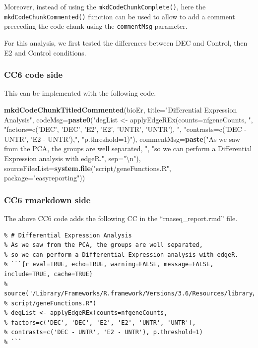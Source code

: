 \documentclass[]{article}
\newenvironment{Shaded}{\begin{snugshade}}{\end{snugshade}}
\newcommand{\CharTok}[1]{\textcolor[rgb]{0.31,0.60,0.02}{#1}}
\newcommand{\DataTypeTok}[1]{\textcolor[rgb]{0.13,0.29,0.53}{#1}}
\newcommand{\KeywordTok}[1]{\textcolor[rgb]{0.13,0.29,0.53}{\textbf{#1}}}
\newcommand{\NormalTok}[1]{#1}
\newcommand{\StringTok}[1]{\textcolor[rgb]{0.31,0.60,0.02}{#1}}
\begin{document}
Moreover, instead of using the \texttt{mkdCodeChunkComplete()}, here the
\texttt{mkdCodeChunkCommented()} function can be used to allow to add a
comment preceeding the code chunk using the \texttt{commentMsg}
parameter.

For this analysis, we first tested the differences between DEC and
Control, then E2 and Control conditions.

\hypertarget{cc6-code-side}{%
\subsubsection{CC6 code side}\label{cc6-code-side}}

This can be implemented with the following code.

\begin{Shaded}
\begin{Highlighting}[]
\KeywordTok{mkdCodeChunkTitledCommented}\NormalTok{(bioEr, }\DataTypeTok{title=}\StringTok{"Differential Expression Analysis"}\NormalTok{,}
                \DataTypeTok{codeMsg=}\KeywordTok{paste0}\NormalTok{(}\StringTok{"degList <- applyEdgeREx(counts=nfgeneCounts, "}\NormalTok{,}
                \StringTok{"factors=c('DEC', 'DEC', 'E2', 'E2', 'UNTR', 'UNTR'), "}\NormalTok{,}
                \StringTok{"contrasts=c('DEC - UNTR', 'E2 - UNTR'),"}\NormalTok{,}
                \StringTok{"p.threshold=1)"}\NormalTok{),}
            \DataTypeTok{commentMsg=}\KeywordTok{paste}\NormalTok{(}\StringTok{"As we saw from the PCA, the groups are well separated, "}\NormalTok{,}
            \StringTok{"so we can perform a Differential Expression analysis with edgeR."}\NormalTok{, }\DataTypeTok{sep=}\StringTok{"}\CharTok{\textbackslash{}n}\StringTok{"}\NormalTok{),}
            \DataTypeTok{sourceFilesList=}\KeywordTok{system.file}\NormalTok{(}\StringTok{"script/geneFunctions.R"}\NormalTok{, }\DataTypeTok{package=}\StringTok{"easyreporting"}\NormalTok{))}
\end{Highlighting}
\end{Shaded}

\hypertarget{cc6-rmarkdown-side}{%
\subsubsection{CC6 rmarkdown side}\label{cc6-rmarkdown-side}}

The above CC6 code adds the following CC in the ``rnaseq\_report.rmd''
file.

\begin{verbatim}
% # Differential Expression Analysis
% As we saw from the PCA, the groups are well separated, 
% so we can perform a Differential Expression analysis with edgeR.
% ```{r eval=TRUE, echo=TRUE, warning=FALSE, message=FALSE, include=TRUE, cache=TRUE}
% source("/Library/Frameworks/R.framework/Versions/3.6/Resources/library/easyreporting/
% script/geneFunctions.R")
% degList <- applyEdgeREx(counts=nfgeneCounts, 
% factors=c('DEC', 'DEC', 'E2', 'E2', 'UNTR', 'UNTR'), 
% contrasts=c('DEC - UNTR', 'E2 - UNTR'), p.threshold=1)
% ```
\end{verbatim}
\end{document}
